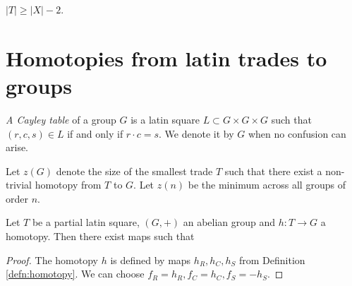 \begin{cor}
\label{cor:size-of-t}
$|T| \geq |X|-2$.
\end{cor}

\section{Homotopies from latin trades to groups}

\begin{defn}
\emph{A Cayley table} of a group $G$ is a latin square $L \subset G \times G \times G$ such that $(r,c,s) \in L$ if and only if $r \cdot c = s$. We denote it by $G$ when no confusion can arise.
\end{defn}

\begin{defn}
Let $z(G)$ denote the size of the smallest trade $T$ such that there exist a non-trivial homotopy from $T$ to $G$. Let \emph{$z(n)$} be the minimum across all groups of order $n$.
\end{defn}

\begin{lem}
\label{lem:abelian-embedding}
Let $T$ be a partial latin square, $(G,+)$ an abelian group and $h: T \rightarrow G$ a homotopy. Then there exist maps
%
such that
\end{lem}
\begin{proof}
The homotopy $h$ is defined by maps $h_R,h_C,h_S$ from Definition \ref{defn:homotopy}. We can choose $f_R = h_R, f_C = h_C, f_S = -h_S$.
\end{proof}


